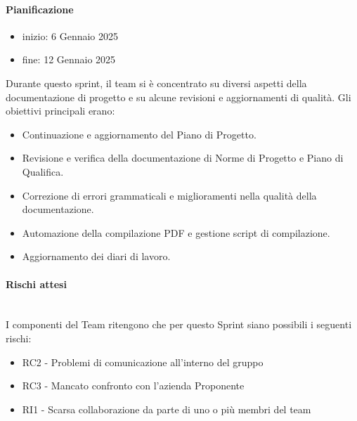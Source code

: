 \documentclass{article}
\begin{document}
                \paragraph{Pianificazione}
                \begin{itemize}
                    \item inizio: 6 Gennaio 2025
                    \item fine: 12 Gennaio 2025
                \end{itemize}
                Durante questo sprint, il team si è concentrato su diversi aspetti della documentazione di progetto e su alcune revisioni e aggiornamenti di qualità. Gli obiettivi principali erano:
                \begin{itemize}
                    \item Continuazione e aggiornamento del Piano di Progetto.
                    \item Revisione e verifica della documentazione di Norme di Progetto e Piano di Qualifica.
                    \item Correzione di errori grammaticali e miglioramenti nella qualità della documentazione.
                    \item Automazione della compilazione PDF e gestione script di compilazione.
                    \item Aggiornamento dei diari di lavoro.
                \end{itemize}


                \paragraph{Rischi attesi}\mbox{}\\
                I componenti del Team ritengono che per questo Sprint siano possibili i seguenti rischi:
                \begin{itemize}
                    \item RC2 - Problemi di comunicazione all’interno del gruppo
                    \item RC3 - Mancato confronto con l’azienda Proponente
                    \item RI1 - Scarsa collaborazione da parte di uno o più membri del team
                \end{itemize}
\end{document}
